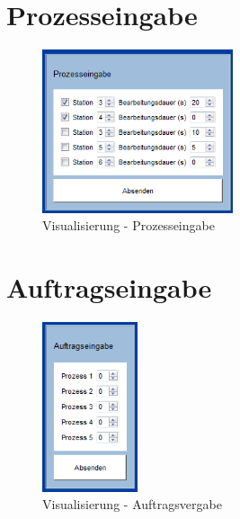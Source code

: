 \section{Prozesseingabe}

\begin{figure}[htb]
    \centering
    \includegraphics[width=0.5\textwidth]{Abbildungen/Prozesseingabe.png}
    \caption{Visualisierung - Prozesseingabe}		
    \label{fig:Prozesseingabe}
\end{figure}

\section{Auftragseingabe}

\begin{figure}[htb]
    \centering
    \includegraphics[width=0.25\textwidth]{Abbildungen/Auftragsvergabe.png}
    \caption{Visualisierung - Auftragsvergabe}		
    \label{fig:Auftragsvergabe}
\end{figure}


